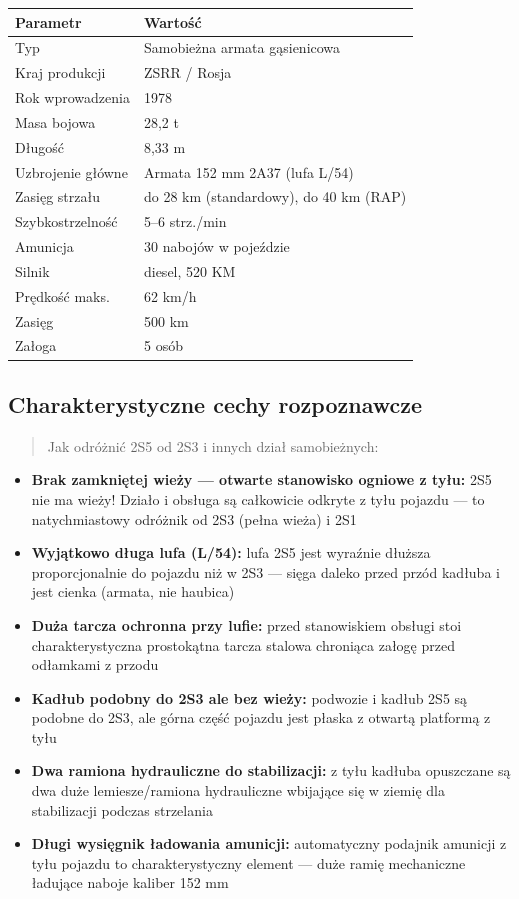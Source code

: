 \documentclass[12pt,oneside]{book}
\providecommand{\tightlist}{%
  \setlength{\itemsep}{0pt}\setlength{\parskip}{0pt}}
\begin{document}
\begin{longtable}[]{@{}ll@{}}
\toprule\noalign{}
Parametr & Wartość \\
\midrule\noalign{}
\endhead
\bottomrule\noalign{}
\endlastfoot
Typ & Samobieżna armata gąsienicowa \\
Kraj produkcji & ZSRR / Rosja \\
Rok wprowadzenia & 1978 \\
Masa bojowa & 28,2 t \\
Długość & 8,33 m \\
Uzbrojenie główne & Armata 152 mm 2A37 (lufa L/54) \\
Zasięg strzału & do 28 km (standardowy), do 40 km (RAP) \\
Szybkostrzelność & 5--6 strz./min \\
Amunicja & 30 nabojów w pojeździe \\
Silnik & diesel, 520 KM \\
Prędkość maks. & 62 km/h \\
Zasięg & 500 km \\
Załoga & 5 osób \\
\end{longtable}

\subsection{Charakterystyczne cechy
rozpoznawcze}\label{charakterystyczne-cechy-rozpoznawcze-21}

\begin{quote}
Jak odróżnić 2S5 od 2S3 i innych dział samobieżnych:
\end{quote}

\begin{itemize}
\tightlist
\item
  \textbf{Brak zamkniętej wieży --- otwarte stanowisko ogniowe z tyłu:}
  2S5 nie ma wieży! Działo i obsługa są całkowicie odkryte z tyłu
  pojazdu --- to natychmiastowy odróżnik od 2S3 (pełna wieża) i 2S1
\item
  \textbf{Wyjątkowo długa lufa (L/54):} lufa 2S5 jest wyraźnie dłuższa
  proporcjonalnie do pojazdu niż w 2S3 --- sięga daleko przed przód
  kadłuba i jest cienka (armata, nie haubica)
\item
  \textbf{Duża tarcza ochronna przy lufie:} przed stanowiskiem obsługi
  stoi charakterystyczna prostokątna tarcza stalowa chroniąca załogę
  przed odłamkami z przodu
\item
  \textbf{Kadłub podobny do 2S3 ale bez wieży:} podwozie i kadłub 2S5 są
  podobne do 2S3, ale górna część pojazdu jest płaska z otwartą
  platformą z tyłu
\item
  \textbf{Dwa ramiona hydrauliczne do stabilizacji:} z tyłu kadłuba
  opuszczane są dwa duże lemiesze/ramiona hydrauliczne wbijające się w
  ziemię dla stabilizacji podczas strzelania
\item
  \textbf{Długi wysięgnik ładowania amunicji:} automatyczny podajnik
  amunicji z tyłu pojazdu to charakterystyczny element --- duże ramię
  mechaniczne ładujące naboje kaliber 152 mm
\end{itemize}
\end{document}
